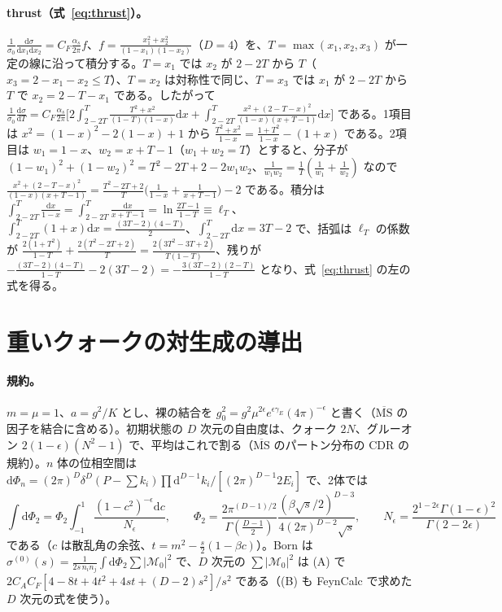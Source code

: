 \documentclass[a4paper,10pt]{ltjsarticle}
\newcommand{\dd}{\mathrm{d}}
\newcommand{\MSbar}{\overline{\mathrm{MS}}}
\begin{document}
\paragraph{thrust（式~\eqref{eq:thrust}）。}$\frac1{\sigma_0}\frac{\dd\sigma}{\dd x_1\dd x_2}=C_F\frac{\alpha_s}{2\pi}f$、$f=\frac{x_1^2+x_2^2}{(1-x_1)(1-x_2)}$（$D=4$）を、$T=\max(x_1,x_2,x_3)$ が一定の線に沿って積分する。$T=x_1$ では $x_2$ が $2-2T$ から $T$（$x_3=2-x_1-x_2\le T$）、$T=x_2$ は対称性で同じ、$T=x_3$ では $x_1$ が $2-2T$ から $T$ で $x_2=2-T-x_1$ である。したがって $\frac1{\sigma_0}\frac{\dd\sigma}{\dd T}=C_F\frac{\alpha_s}{2\pi}\bigl[2\int_{2-2T}^T\frac{T^2+x^2}{(1-T)(1-x)}\dd x+\int_{2-2T}^T\frac{x^2+(2-T-x)^2}{(1-x)(x+T-1)}\dd x\bigr]$ である。1項目は $x^2=(1-x)^2-2(1-x)+1$ から $\frac{T^2+x^2}{1-x}=\frac{1+T^2}{1-x}-(1+x)$ である。2項目は $w_1=1-x$、$w_2=x+T-1$（$w_1+w_2=T$）とすると、分子が $(1-w_1)^2+(1-w_2)^2=T^2-2T+2-2w_1w_2$、$\frac1{w_1w_2}=\frac1T(\frac1{w_1}+\frac1{w_2})$ なので $\frac{x^2+(2-T-x)^2}{(1-x)(x+T-1)}=\frac{T^2-2T+2}{T}\bigl(\frac1{1-x}+\frac1{x+T-1}\bigr)-2$ である。積分は $\int_{2-2T}^T\frac{\dd x}{1-x}=\int_{2-2T}^T\frac{\dd x}{x+T-1}=\ln\frac{2T-1}{1-T}\equiv\ell_T$、$\int_{2-2T}^T(1+x)\dd x=\frac{(3T-2)(4-T)}2$、$\int_{2-2T}^T\dd x=3T-2$ で、括弧は $\ell_T$ の係数が $\frac{2(1+T^2)}{1-T}+\frac{2(T^2-2T+2)}{T}=\frac{2(3T^2-3T+2)}{T(1-T)}$、残りが $-\frac{(3T-2)(4-T)}{1-T}-2(3T-2)=-\frac{3(3T-2)(2-T)}{1-T}$ となり、式~\eqref{eq:thrust} の左の式を得る。

\section{重いクォークの対生成の導出}\label{app:hq}

\paragraph{規約。}$m=\mu=1$、$a=g^2/K$ とし、裸の結合を $g_0^2=g^2\mu^{2\epsilon}e^{\epsilon\gamma_E}(4\pi)^{-\epsilon}$ と書く（$\MSbar$ の因子を結合に含める）。初期状態の $D$ 次元の自由度は、クォーク $2N$、グルーオン $2(1-\epsilon)(N^2-1)$ で、平均はこれで割る（$\MSbar$ のパートン分布の CDR の規約）。$n$ 体の位相空間は $\dd\Phi_n=(2\pi)^D\delta^D(P-\sum k_i)\prod\dd^{D-1}k_i/[(2\pi)^{D-1}2E_i]$ で、2体では
\begin{equation*}
\int\dd\Phi_2=\Phi_2\int_{-1}^1\frac{(1-c^2)^{-\epsilon}\dd c}{N_\epsilon},\qquad
\Phi_2=\frac{2\pi^{(D-1)/2}}{\Gamma(\frac{D-1}2)}\frac{(\beta\sqrt s/2)^{D-3}}{4(2\pi)^{D-2}\sqrt s},\qquad N_\epsilon=\frac{2^{1-2\epsilon}\Gamma(1-\epsilon)^2}{\Gamma(2-2\epsilon)}
\end{equation*}
である（$c$ は散乱角の余弦、$t=m^2-\frac s2(1-\beta c)$）。Born は $\sigma^{(0)}(s)=\frac1{2s\,n_in_j}\int\dd\Phi_2\sum|\mathcal M_0|^2$ で、$D$ 次元の $\sum|\mathcal M_0|^2$ は (A) で $2C_AC_F[4-8t+4t^2+4st+(D-2)s^2]/s^2$ である（(B) も FeynCalc で求めた $D$ 次元の式を使う）。
\end{document}
